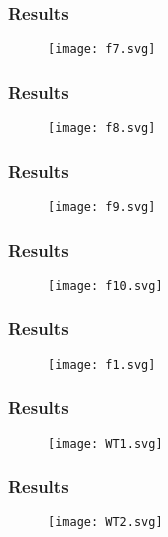 \begin{frame}\frametitle{Results}
\begin{figure}
\centering
\texttt{[image: f7.svg]}
\caption{}
\label{}
\end{figure}

\end{frame}

\begin{frame}\frametitle{Results}
\begin{figure}
\centering
\texttt{[image: f8.svg]}
\caption{}
\label{}
\end{figure}
\end{frame}

\begin{frame}\frametitle{Results}
\begin{figure}
\centering
\texttt{[image: f9.svg]}
\caption{}
\label{}
\end{figure}
\end{frame}

\begin{frame}\frametitle{Results}
\begin{figure}
\centering
\texttt{[image: f10.svg]}
\caption{}
\label{}
\end{figure}
\end{frame}

\begin{frame}\frametitle{Results}
\begin{figure}
\centering
\texttt{[image: f1.svg]}
\caption{}
\label{}
\end{figure}
\end{frame}

\begin{frame}\frametitle{Results}
\begin{figure}
\centering
\texttt{[image: WT1.svg]}
\caption{}
\label{}
\end{figure}
\end{frame}

\begin{frame}\frametitle{Results}

\begin{figure}
\centering
\texttt{[image: WT2.svg]}
\caption{}
\label{}
\end{figure}

\end{frame}

